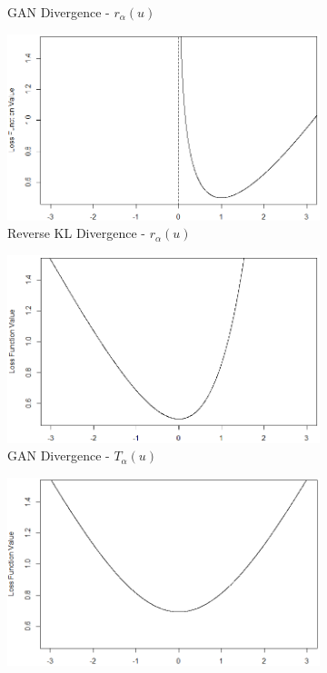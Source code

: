 \documentclass[honours,12pt, twoside]{unswthesis}
\numberwithin{equation}{section}
\theoremstyle{definition}
\begin{document}
\begin{figure}[h!]
\begin{subfigure}{0.49\textwidth}
\caption{GAN Divergence - $r_\alpha(u)$}
\end{subfigure}
\begin{subfigure}{0.49\textwidth}
\includegraphics[width=\linewidth]{KLR.png}
\caption{Reverse KL Divergence - $r_\alpha(u)$}
\end{subfigure}
\begin{subfigure}{0.49\textwidth}
\includegraphics[width=\linewidth]{ADVT.png}
\caption{GAN Divergence - $T_\alpha(u)$}
\end{subfigure}
\begin{subfigure}{0.49\textwidth}
\includegraphics[width=\linewidth]{KLT.png}

\end{subfigure}
\end{figure}
\end{document}
